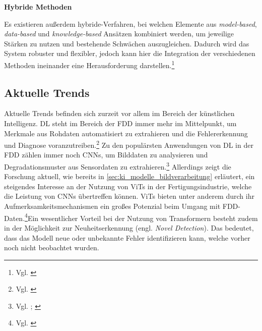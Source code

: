 \textbf{Hybride Methoden}

Es existieren außerdem hybride-Verfahren, bei welchen Elemente aus \textit{model-based}, \textit{data-based} und \textit{knowledge-based} Ansätzen kombiniert werden, um jeweilige Stärken zu nutzen und bestehende Schwächen auszugleichen. Dadurch wird das System robuster und flexibler, jedoch kann hier die Integration der verschiedenen Methoden ineinander eine Herausforderung darstellen.\footnote{Vgl. \cite[S. 22 f.]{mercorelli_recent_2024}}

\subsection{Aktuelle Trends}
Aktuelle Trends befinden sich zurzeit vor allem im Bereich der künstlichen Intelligenz. \ac{DL} steht im Bereich der \ac{FDD} immer mehr im Mittelpunkt, um Merkmale aus Rohdaten automatisiert zu extrahieren und die Fehlererkennung und Diagnose voranzutreiben.\footnote{Vgl. \cite[S. 5991]{wen_new_2018}}
Zu den populärsten Anwendungen von \ac{DL} in der \ac{FDD} zählen immer noch \acp{CNN}, um Bilddaten zu analysieren und Degradationsmuster aus Sensordaten zu extrahieren.\footnote{Vgl. \cite{wu_transformer-based_2023}; \cite[S.  5991]{wen_new_2018}} Allerdings zeigt die Forschung aktuell, wie bereits in \ref{sec:ki_modelle_bildverarbeitung} erläutert, ein steigendes Interesse an der Nutzung von \acp{ViT} in der Fertigungsindustrie, welche die Leistung von \acp{CNN} übertreffen können. \acp{ViT} bieten unter anderem durch ihr Aufmerksamkeitsmechanismen ein großes Potenzial beim Umgang mit \ac{FDD}-Daten.\footnote{Vgl. \cite[S. 440]{wu_transformer-based_2023}}Ein wesentlicher Vorteil bei der Nutzung von Transformern besteht zudem in der Möglichkeit zur Neuheitserkennung (engl. \textit{Novel Detection}). Das bedeutet, dass das Modell neue oder unbekannte Fehler identifizieren kann, welche vorher noch nicht beobachtet wurden.

